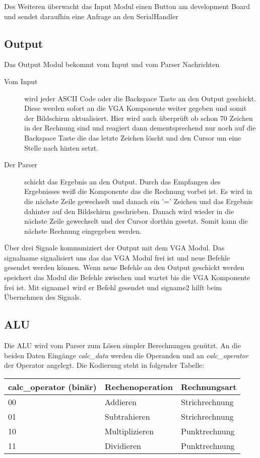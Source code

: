 Des Weiteren überwacht das Input Modul einen Button am development Board und sendet
daraufhin eine Anfrage an den SerialHandler
\subsection{Output}
Das Output Modul bekommt vom Input und vom Parser Nachrichten\\
\begin{description}
 \item[Vom Input] wird jeder ASCII Code oder die Backspace Taste an den Output geschickt. Diese werden
sofort an die VGA Komponente weiter gegeben und somit der Bildschirm aktualisiert. Hier wird auch überprüft ob
schon 70 Zeichen in der Rechnung sind und reagiert dann dementsprechend nur noch auf die Backspace Taste die das letzte Zeichen
löscht und den Cursor um eine Stelle nach hinten setzt.\\
 \item[Der Parser] schickt das Ergebnis an den Output. Durch das Empfangen des Ergebnisses weiß die Komponente
das die Rechnung vorbei ist. Es wird in die nächste Zeile gewechselt und danach ein '=' Zeichen und das Ergebnis
dahinter auf den Bildschirm geschrieben. Danach wird wieder in die nächste Zeile gewechselt und der Cursor dorthin
gesetzt. Somit kann die nächste Rechnung eingegeben werden.
 \end{description}
Über drei Signale kommuniziert der Output mit dem VGA Modul. Das signalname signalisiert uns das das VGA Modul 
frei ist und neue Befehle gesendet werden können. Wenn neue Befehle an den Output geschickt werden speichert das
Modul die Befehle zwischen und wartet bis die VGA Komponente frei ist. Mit signame1 wird er Befehl
gesendet und signame2 hilft beim Übernehmen des Signals.


\subsection{ALU}
Die ALU wird vom Parser zum Lösen simpler Berechnungen genützt. An die beiden Daten Eingänge \textit{calc\_data} werden die Operanden
und an \textit{calc\_operator} der Operator angelegt. Die Kodierung steht in folgender Tabelle:

\begin{center}
\begin{tabular}[!ht]{|l|l|l|}
\hline calc\_operator (binär) & Rechenoperation & Rechnungsart\\ 
	\hline
	00 & Addieren & Strichrechnung\\ 
	01 & Subtrahieren & Strichrechnung\\ 
	10 & Multiplizieren & Punktrechnung\\ 
	11 & Dividieren & Punktrechnung\\
 \hline
\end{tabular}
\end{center}

